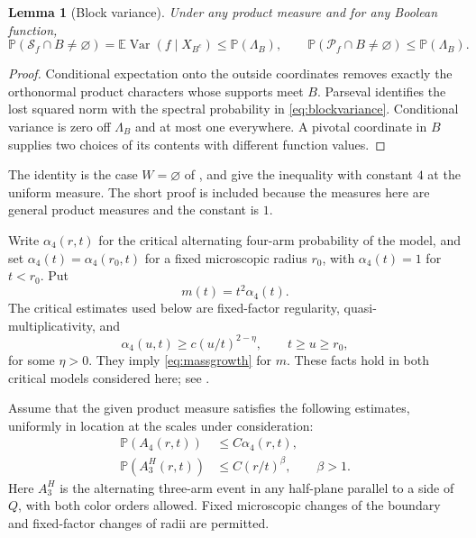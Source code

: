 \documentclass[11pt]{amsart}
\newtheorem{lemma}[theorem]{Lemma}
\theoremstyle{remark}
\newcommand{\Prob}{\mathbb P}
\newcommand{\E}{\mathbb E}
\newcommand{\cS}{\mathcal S}
\newcommand{\cP}{\mathcal P}
\DeclareMathOperator{\Var}{Var}
\begin{document}
\begin{lemma}[Block variance]\label{lem:blockvariance}
Under any product measure and for any Boolean function,
\begin{equation}\label{eq:blockvariance}
 \Prob(\cS_f\cap B\ne\varnothing)
 =\E\Var(f\mid X_{B^c})\le\Prob(\Lambda_B),
 \qquad
 \Prob(\cP_f\cap B\ne\varnothing)\le\Prob(\Lambda_B).
\end{equation}
\end{lemma}
\begin{proof}
Conditional expectation onto the outside coordinates removes exactly the orthonormal product characters whose supports meet $B$. Parseval identifies the lost squared norm with the spectral probability in \eqref{eq:blockvariance}. Conditional variance is zero off $\Lambda_B$ and at most one everywhere. A pivotal coordinate in $B$ supplies two choices of its contents with different function values.
\end{proof}
The identity is the case $W=\varnothing$ of \cite[equation~(2.14)]{GPS}, and \cite[Lemma~2.2 and equation~(3.4)]{GPS} give the inequality with constant $4$ at the uniform measure. The short proof is included because the measures here are general product measures and the constant is $1$.

Write $\alpha_4(r,t)$ for the critical alternating four-arm probability of the model, and set $\alpha_4(t)=\alpha_4(r_0,t)$ for a fixed microscopic radius $r_0$, with $\alpha_4(t)=1$ for $t<r_0$. Put
\[
 m(t)=t^2\alpha_4(t).
\]
The critical estimates used below are fixed-factor regularity, quasi-multiplicativity, and
\begin{equation}\label{eq:armgap}
 \alpha_4(u,t)\ge c(u/t)^{2-\eta},\qquad t\ge u\ge r_0,
\end{equation}
for some $\eta>0$. They imply \eqref{eq:massgrowth} for $m$. These facts hold in both critical models considered here; see \cite[Section~2.2]{GPS}.

Assume that the given product measure satisfies the following estimates, uniformly in location at the scales under consideration:
\begin{align}
 \Prob(A_4(r,t))&\le C\alpha_4(r,t),\label{eq:armactual}\\
 \Prob(A_3^H(r,t))&\le C(r/t)^\beta,\qquad\beta>1.\label{eq:halfarm}
\end{align}
Here $A_3^H$ is the alternating three-arm event in any half-plane parallel to a side of $Q$, with both color orders allowed. Fixed microscopic changes of the boundary and fixed-factor changes of radii are permitted.
\end{document}

